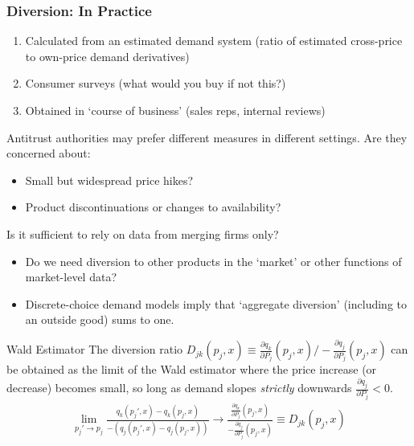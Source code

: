 \documentclass[xcolor=pdftex,dvipsnames,table,mathserif,aspectratio=169]{beamer}
\begin{document}
\begin{frame}
\frametitle{Diversion: In Practice}
\footnotesize
\begin{enumerate}
\item Calculated from an estimated demand system (ratio of estimated cross-price to own-price demand derivatives)
\item Consumer surveys (what would you buy if not this?)
\item Obtained in `course of business' (sales reps, internal reviews)
\end{enumerate}
Antitrust authorities may prefer different measures in different settings. Are they concerned about:
\begin{itemize}
\item Small but widespread price hikes?
\item Product discontinuations or changes to availability?
\end{itemize}
Is it sufficient to rely on data from merging firms only?
\begin{itemize}
\item Do we need diversion to other products in the `market' or other functions of market-level data?
\item Discrete-choice demand models imply that `aggregate diversion' (including to an outside good) sums to one.
\end{itemize}
\end{frame}


\begin{frame}{Wald Estimator}
The diversion ratio $D_{jk}(p_j,x) \equiv\frac{\partial q_k}{\partial P_j}(p_j,x)/-\frac{\partial q_j}{\partial P_j}(p_j,x)$ can be obtained as the limit of the Wald estimator where the price increase (or decrease) becomes small, so long as demand slopes \textit{strictly} downwards $\frac{\partial q_j}{\partial P_j} <0$.
\begin{align*}                               
\lim_{p_j' \rightarrow p_j} \frac{q_k(p_j',x) - q_k(p_j,x)}{-(q_j(p_j',x) - q_j(p_j,x))} \rightarrow \frac{\frac{\partial q_k}{\partial P_j}(p_j,x)}{-\frac{\partial q_j}{\partial P_j}(p_j,x)} \equiv D_{jk}(p_j,x)
\end{align*}
\end{frame}
\end{document}
